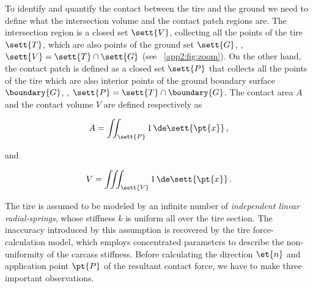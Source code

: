 To identify and quantify the contact between the tire and the ground we need to define what the intersection volume and the contact patch regions are. The intersection region is a closed set $\sett{V}$, collecting all the points of the tire $\sett{T}$, which are also points of the ground set $\sett{G}$, \ie{}, $\sett{V} = \sett{T} \cap \sett{G}$ (see \figurename{}~\ref{app2:fig:zoom}). On the other hand, the contact patch is defined as a closed set $\sett{P}$ that collects all the points of the tire which are also interior points of the ground boundary surface $\boundary{G}$, \ie{}, $\sett{P} = \sett{T} \cap \boundary{G}$. The contact area $A$ and the contact volume $V$ are defined respectively as
%
\begin{center}
  \begin{minipage}[b]{0.425\textwidth}
    \vspace{-\baselineskip}
    \begin{equation}
      A = \iint_\sett{P} 1 \, \de\sett{\pt{x}}  \, \text{,}
      \label{app2:eq:int_area}
    \end{equation}
  \end{minipage}%
  \hfill\hfill and \hfill
  \begin{minipage}[b]{0.425\textwidth}
    \vspace{-\baselineskip}
    \begin{equation}
      V = \iiint_\sett{V} 1 \, \de\sett{\pt{x}} \, \text{.}
      \label{app2:eq:int_volume}
    \end{equation}
  \end{minipage}
\end{center}

The tire is assumed to be modeled by an infinite number of \emph{independent linear radial-springs}, whose stiffness $k$ is uniform all over the tire section. The inaccuracy introduced by this assumption is recovered by the tire force-calculation model, which employs concentrated parameters to describe the non-uniformity of the carcass stiffness. Before calculating the direction $\et{n}$ and application point $\pt{P}$ of the resultant contact force, we have to make three important observations.

